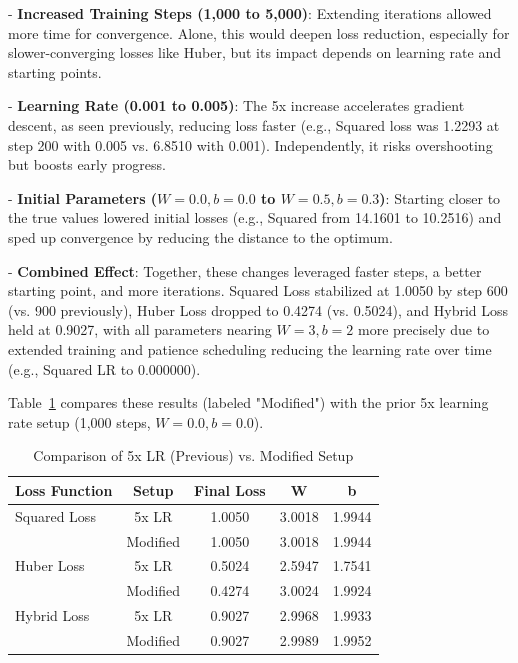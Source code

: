 \documentclass{article}
\begin{document}
- \textbf{Increased Training Steps (1,000 to 5,000)}: Extending iterations allowed more time for convergence. Alone, this would deepen loss reduction, especially for slower-converging losses like Huber, but its impact depends on learning rate and starting points.
  
- \textbf{Learning Rate (0.001 to 0.005)}: The 5x increase accelerates gradient descent, as seen previously, reducing loss faster (e.g., Squared loss was 1.2293 at step 200 with 0.005 vs. 6.8510 with 0.001). Independently, it risks overshooting but boosts early progress.

- \textbf{Initial Parameters (\( W = 0.0, b = 0.0 \) to \( W = 0.5, b = 0.3 \))}: Starting closer to the true values lowered initial losses (e.g., Squared from 14.1601 to 10.2516) and sped up convergence by reducing the distance to the optimum.

- \textbf{Combined Effect}: Together, these changes leveraged faster steps, a better starting point, and more iterations. Squared Loss stabilized at 1.0050 by step 600 (vs. 900 previously), Huber Loss dropped to 0.4274 (vs. 0.5024), and Hybrid Loss held at 0.9027, with all parameters nearing \( W = 3, b = 2 \) more precisely due to extended training and patience scheduling reducing the learning rate over time (e.g., Squared LR to 0.000000).

Table~\ref{tab:mod_comparison} compares these results (labeled "Modified") with the prior 5x learning rate setup (1,000 steps, \( W = 0.0, b = 0.0 \)).

\begin{table}[H]
    \centering
    \caption{Comparison of 5x LR (Previous) vs. Modified Setup}
    \label{tab:mod_comparison}
    \begin{tabular}{lcccc}
        \toprule
        \textbf{Loss Function} & \textbf{Setup} & \textbf{Final Loss} & \textbf{W} & \textbf{b} \\
        \midrule
        Squared Loss & 5x LR   & 1.0050 & 3.0018 & 1.9944 \\
                     & Modified & 1.0050 & 3.0018 & 1.9944 \\
        Huber Loss   & 5x LR   & 0.5024 & 2.5947 & 1.7541 \\
                     & Modified & 0.4274 & 3.0024 & 1.9924 \\
        Hybrid Loss  & 5x LR   & 0.9027 & 2.9968 & 1.9933 \\
                     & Modified & 0.9027 & 2.9989 & 1.9952 \\
        \bottomrule
    \end{tabular}
\end{table}
\end{document}
